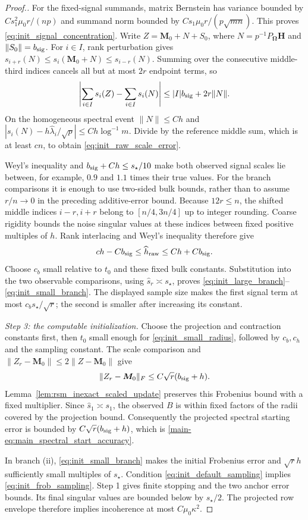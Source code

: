 \documentclass[numsec,webpdf,modern,large,namedate]{oup-authoring-template}
\theoremstyle{plain}
\theoremstyle{remark}
\newcommand{\M}{\bm{M}}
\newcommand{\bH}{\bm{H}}
\newcommand{\bOmega}{\bm{\Omega}}
\newif\ifmarkchanges
\newenvironment{revision}{\begingroup\ifmarkchanges\color{red}\fi}{\endgroup}
\begin{document}
\begin{revision}
\begin{proof}[Proof.]
For the fixed-signal summands, matrix Bernstein has variance bounded by
$Cs_1^2\mu_0r/(np)$ and summand norm bounded by
$Cs_1\mu_0r/(p\sqrt{mn})$.  This proves
\eqref{eq:init_signal_concentration}.  Write
$Z=\M_0+N+S_0$, where $N=p^{-1}P_{\bOmega}\bH$ and
$\|S_0\|=b_{\rm sig}$.
For $i\in I$, rank perturbation gives
$s_{i+r}(N)\le s_i(\M_0+N)\le s_{i-r}(N)$.
Summing over the consecutive middle-third indices cancels all but at most
$2r$ endpoint terms, so
\[
 \left|\sum_{i\in I}s_i(Z)-\sum_{i\in I}s_i(N)\right|
 \le |I|b_{\rm sig}+2r\|N\|.
\]
On the homogeneous spectral event $\|N\|\le Ch$ and
$|s_i(N)-h\widehat\lambda_i/\sqrt p|\le Ch\log^{-1}m$.
Divide by the reference middle sum, which is at least $cn$, to obtain
\eqref{eq:init_raw_scale_error}.  

Weyl's inequality and $b_{\rm sig}+Ch\le s_\star/10$ make both
observed signal scales lie between, for example, $0.9$ and $1.1$ times
their true values.  For the branch comparisons it is enough to use two-sided bulk bounds,
rather than to assume $r/n\to0$ in the preceding additive-error bound.
Because $12r\le n$, the shifted middle indices $i-r,i+r$ belong to
$[n/4,3n/4]$ up to integer rounding.  Coarse rigidity bounds the noise
singular values at these indices between fixed positive multiples of $h$.
Rank interlacing and Weyl's inequality therefore give
\[
 c h-Cb_{\rm sig}\le\widehat h_{\rm raw}
                        \le C h+Cb_{\rm sig}.
\]
Choose $c_b$ small relative to $t_0$ and these fixed bulk constants.
Substitution into the two observable comparisons, using
$\widehat s_r\asymp s_\star$, proves
\eqref{eq:init_large_branch}--\eqref{eq:init_small_branch}.
The displayed sample size makes the first signal term at most
$c_bs_\star/\sqrt r$; the second is smaller after increasing its constant.

\textit{Step 3: the computable initialization.} Choose the projection and contraction constants first, then $t_0$ small
enough for \eqref{eq:init_small_radius}, followed by $c_b,c_h$ and the
sampling constant.  The scale comparison and
$\|Z_r-\M_0\|\le2\|Z-\M_0\|$ give
\[
 \|Z_r-\M_0\|_F\le C\sqrt r(b_{\rm sig}+h).
\]
Lemma~\ref{lem:rsm_inexact_scaled_update} preserves this Frobenius bound with a
fixed multiplier.  Since $\widehat s_1\asymp s_1$, the observed $B$
is within fixed factors of the radii covered by the projection bound.
Consequently the projected spectral starting error is bounded by
$C\sqrt r(b_{\rm sig}+h)$, which is
\eqref{main-eq:main_spectral_start_accuracy}.

In branch (ii), \eqref{eq:init_small_branch} makes the initial Frobenius
error and $\sqrt r h$ sufficiently small multiples of $s_\star$.
Condition \eqref{eq:init_default_sampling} implies
\eqref{eq:init_frob_sampling}.  Step 1 gives
finite stopping and the two anchor error bounds.  Its final singular
values are bounded below by $s_\star/2$.  The projected row envelope
therefore implies incoherence at most $C\mu_0\kappa^2$.


\end{proof}
\end{revision}
\end{document}
